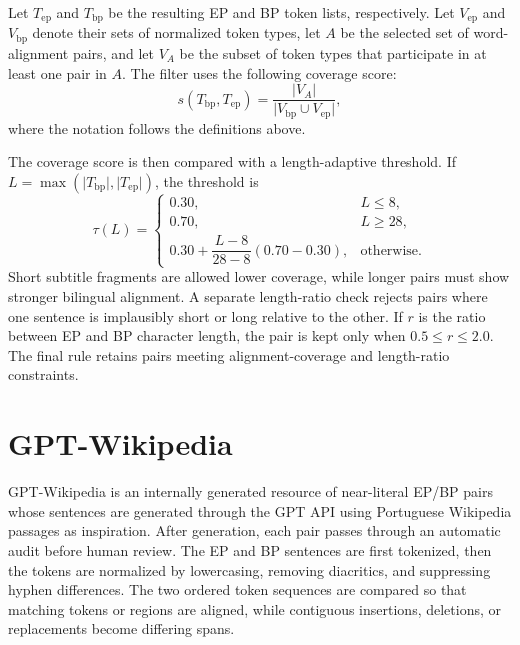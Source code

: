 Let \(T_{\mathrm{ep}}\) and \(T_{\mathrm{bp}}\) be the resulting EP and BP token
lists, respectively. Let \(V_{\mathrm{ep}}\) and \(V_{\mathrm{bp}}\) denote
their sets of normalized token types, let \(A\) be the selected set of
word-alignment pairs, and let \(V_A\) be the subset of token types that
participate in at least one pair in \(A\). The filter uses the following
coverage score:
\begin{equation}
s(T_{\mathrm{bp}}, T_{\mathrm{ep}}) =
\frac{\lvert V_A \rvert}
{\lvert V_{\mathrm{bp}} \cup V_{\mathrm{ep}} \rvert},
\end{equation}
where the notation follows the definitions above.

The coverage score is then compared with a length-adaptive threshold. If
\(L = \max(\lvert T_{\mathrm{bp}} \rvert, \lvert T_{\mathrm{ep}} \rvert)\),
the threshold is
\begin{equation}
\tau(L)=
\begin{cases}
0.30, & L \leq 8, \\
0.70, & L \geq 28, \\
0.30 + \dfrac{L-8}{28-8}(0.70-0.30), & \text{otherwise.}
\end{cases}
\end{equation}
Short subtitle fragments are allowed lower coverage, while longer pairs must
show stronger bilingual alignment. A separate length-ratio check rejects pairs
where one sentence is implausibly short or long relative to the other. If \(r\) is
the ratio between EP and BP character length, the pair is kept only when
\(0.5 \leq r \leq 2.0\). The final rule retains pairs meeting alignment-coverage and length-ratio constraints.

\clearpage
\section{GPT-Wikipedia}
\label{sec:appendix-gpt-wikipedia}

GPT-Wikipedia is an internally generated resource of near-literal EP/BP pairs
whose sentences are generated through the GPT API using Portuguese Wikipedia
passages as inspiration. After generation, each pair passes through an automatic audit
before human review. The EP and BP sentences are first tokenized, then the
tokens are normalized by lowercasing, removing diacritics, and suppressing
hyphen differences. The two ordered token sequences are compared so that
matching tokens or regions are aligned, while contiguous insertions, deletions,
or replacements become differing spans.

